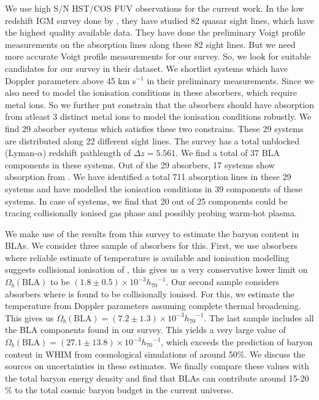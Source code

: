 We use high S/N HST/COS FUV observations for the current work. In the low redshift IGM survey done by \citet{danforth-2016}, they have studied 82 quasar sight lines, which have the highest quality available data. They have done the preliminary Voigt profile measurements on the absorption lines along these 82 sight lines. But we need more accurate Voigt profile measurements for our survey. So, we look for suitable candidates for our survey in their dataset. We shortlist systems which have  Doppler parameters above 45 km s$^{-1}$ in their preliminary measurements. Since we also need to model the ionisation conditions in these absorbers, which require metal ions. So we further put constrain that the absorbers should have absorption from atleast 3 distinct metal ions to model the ionisation conditions robustly. We find 29 absorber systems which satisfies these two constrains. These 29 systems are distributed along 22 different sight lines. The survey has a total unblocked  (Lyman-$\alpha$) redshift pathlength of $\Delta z = 5.561$.  We find a total of 37 BLA components in these systems. Out of the 29 absorbers, 17 systems show absorption from . We have identified a total 711 absorption lines in these 29 systems and have modelled the ionisation conditions in 39 components of these systems. In case of  systems, we find that 20 out of 25  components could be tracing collisionally ionised gas phase and possibly probing warm-hot plasma. 

We make use of the results from this survey to estimate the baryon content in BLAs. We consider three sample of absorbers for this. First, we use absorbers where reliable estimate of temperature is available and ionisation modelling suggests collisional ionisation of , this gives us a very conservative lower limit on $\Omega_b(\text{BLA})$ to be $(1.8 \pm 0.5) \times 10^{-3} {h_{70}}^{-1}$. Our second sample considers absorbers where  is found to be collisionally ionised. For this, we estimate the temperature from Doppler parameters assuming complete thermal broadening. This gives us $\Omega_b(\text{BLA})=(7.2 \pm 1.3) \times 10^{-3} {h_{70}}^{-1}$. The last sample includes all the BLA components found in our survey. This yields a very large value of $\Omega_b(\text{BLA})=(27.1 \pm 13.8) \times 10^{-3} {h_{70}}^{-1}$, which exceeds the prediction of baryon content in WHIM from cosmological simulations of around 50\%. We discuss the sources on uncertainties in these estimates. We finally compare these values with the total baryon energy density and find that BLAs can contribute around 15-20 \% to the total cosmic baryon budget in the current universe.

